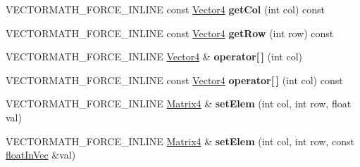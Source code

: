 \begin{DoxyCompactItemize}
\item 
\mbox{\label{classVectormath_1_1Aos_1_1Matrix4_a7ee299c07ce0208828540034ae2208e9}} 
V\+E\+C\+T\+O\+R\+M\+A\+T\+H\+\_\+\+F\+O\+R\+C\+E\+\_\+\+I\+N\+L\+I\+NE const \hyperlink{classVectormath_1_1Aos_1_1Vector4}{Vector4} {\bfseries get\+Col} (int col) const
\item 
\mbox{\label{classVectormath_1_1Aos_1_1Matrix4_aac94b851717068731faa29f0d2ed2d45}} 
V\+E\+C\+T\+O\+R\+M\+A\+T\+H\+\_\+\+F\+O\+R\+C\+E\+\_\+\+I\+N\+L\+I\+NE const \hyperlink{classVectormath_1_1Aos_1_1Vector4}{Vector4} {\bfseries get\+Row} (int row) const
\item 
\mbox{\label{classVectormath_1_1Aos_1_1Matrix4_af36875c0af894fab9226e6b21e466884}} 
V\+E\+C\+T\+O\+R\+M\+A\+T\+H\+\_\+\+F\+O\+R\+C\+E\+\_\+\+I\+N\+L\+I\+NE \hyperlink{classVectormath_1_1Aos_1_1Vector4}{Vector4} \& {\bfseries operator\mbox{[}$\,$\mbox{]}} (int col)
\item 
\mbox{\label{classVectormath_1_1Aos_1_1Matrix4_af6d6875c899486d5fe76760824c93da1}} 
V\+E\+C\+T\+O\+R\+M\+A\+T\+H\+\_\+\+F\+O\+R\+C\+E\+\_\+\+I\+N\+L\+I\+NE const \hyperlink{classVectormath_1_1Aos_1_1Vector4}{Vector4} {\bfseries operator\mbox{[}$\,$\mbox{]}} (int col) const
\item 
\mbox{\label{classVectormath_1_1Aos_1_1Matrix4_aa3816590c2f9bc523410259e83f47056}} 
V\+E\+C\+T\+O\+R\+M\+A\+T\+H\+\_\+\+F\+O\+R\+C\+E\+\_\+\+I\+N\+L\+I\+NE \hyperlink{classVectormath_1_1Aos_1_1Matrix4}{Matrix4} \& {\bfseries set\+Elem} (int col, int row, float val)
\item 
\mbox{\label{classVectormath_1_1Aos_1_1Matrix4_afff16d6e95988fd932a26781d35076a1}} 
V\+E\+C\+T\+O\+R\+M\+A\+T\+H\+\_\+\+F\+O\+R\+C\+E\+\_\+\+I\+N\+L\+I\+NE \hyperlink{classVectormath_1_1Aos_1_1Matrix4}{Matrix4} \& {\bfseries set\+Elem} (int col, int row, const \hyperlink{classVectormath_1_1floatInVec}{float\+In\+Vec} \&val)
\item 
\mbox{\label{classVectormath_1_1Aos_1_1Matrix4_a4973ab78a2493bd320b684ac3c63f272}} 

\end{DoxyCompactItemize}
